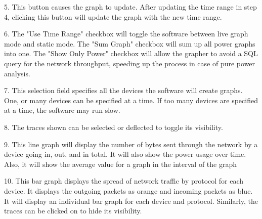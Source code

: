 5. This button causes the graph to update. After updating the time range in step 4, clicking this button will update the graph with the new time range.

6. The "Use Time Range" checkbox will toggle the software between live graph mode and static mode. The "Sum Graph" checkbox will sum up all power graphs into one. The "Show Only Power" checkbox will allow the grapher to avoid a SQL query for the network throughput, speeding up the process in case of pure power analysis.

7. This selection field specifies all the devices the software will create graphs. One, or many devices can be specified at a time. If too many devices are specified at a time, the software may run slow.

8. The traces shown can be selected or deflected to toggle its visibility.

9. This line graph will display the number of bytes sent through the network by a device going in, out, and in total. It will also show the power usage over time. Also, it will show the average value for a graph in the interval of the graph

10. This bar graph displays the spread of network traffic by protocol for each device. It displays the outgoing packets as orange and incoming packets as blue. It will display an individual bar graph for each device and protocol. Similarly, the traces can be clicked on to hide its visibility.
